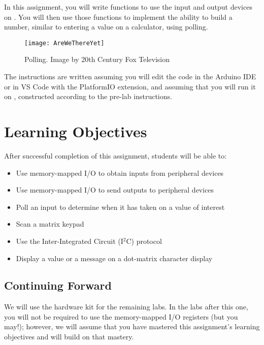 In this assignment, you will write functions to use the input and output devices on \runtimeenvironment.
You will then use those functions to implement the ability to build a number, similar to entering a value on a calculator, using polling.

\begin{figure}[h]
    \centering
    \texttt{[image: AreWeThereYet]}
    \caption{Polling. \tiny Image by 20th Century Fox Television}
\end{figure}

The instructions are written assuming you will edit the code in the Arduino IDE or in VS Code with the PlatformIO extension, and assuming that you will run it on \runtimeenvironment, constructed according to the pre-lab instructions.

\tableofcontents

\section*{Learning Objectives}

After successful completion of this assignment, students will be able to:
\begin{itemize}
\item Use memory-mapped I/O to obtain inputs from peripheral devices
\item Use memory-mapped I/O to send outputs to peripheral devices
\item Poll an input to determine when it has taken on a value of interest
\item Scan a matrix keypad
\item Use the Inter-Integrated Circuit (I$^2$C) protocol
\item Display a value or a message on a dot-matrix character display
\end{itemize}

\subsection*{Continuing Forward}

We will use the hardware kit for the remaining labs.
In the labs after this one, you will not be required to use the memory-mapped I/O registers (but you may!);
however, we will assume that you have mastered this assignment's learning objectives and will build on that mastery.

